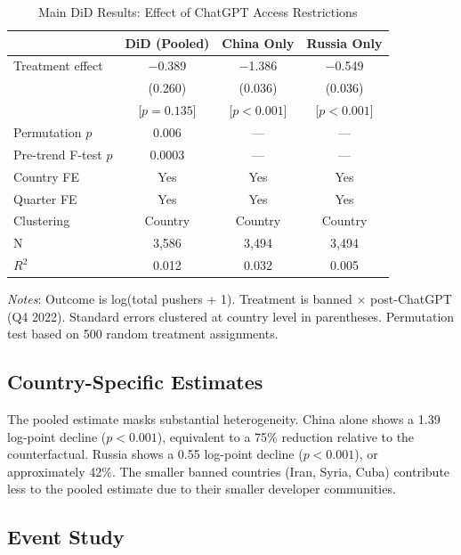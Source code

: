 \documentclass[12pt]{article}
\begin{document}
\begin{table}[H]
\centering
\begin{threeparttable}
\caption{Main DiD Results: Effect of ChatGPT Access Restrictions}
\label{tab:main}
\small
\begin{tabular}{lccc}
\toprule
 & DiD (Pooled) & China Only & Russia Only \\
\midrule
Treatment effect & $-$0.389 & $-$1.386 & $-$0.549 \\
 & (0.260) & (0.036) & (0.036) \\
 & [$p = 0.135$] & [$p < 0.001$] & [$p < 0.001$] \\
\midrule
Permutation $p$ & 0.006 & --- & --- \\
Pre-trend F-test $p$ & 0.0003 & --- & --- \\
\midrule
Country FE & Yes & Yes & Yes \\
Quarter FE & Yes & Yes & Yes \\
Clustering & Country & Country & Country \\
N & 3,586 & 3,494 & 3,494 \\
$R^2$ & 0.012 & 0.032 & 0.005 \\
\bottomrule
\end{tabular}
\begin{tablenotes}
\small
\item \textit{Notes}: Outcome is log(total pushers + 1). Treatment is banned $\times$ post-ChatGPT (Q4 2022). Standard errors clustered at country level in parentheses. Permutation test based on 500 random treatment assignments.
\end{tablenotes}
\end{threeparttable}
\end{table}

\subsection{Country-Specific Estimates}

The pooled estimate masks substantial heterogeneity. China alone shows a 1.39 log-point decline ($p < 0.001$), equivalent to a 75\% reduction relative to the counterfactual. Russia shows a 0.55 log-point decline ($p < 0.001$), or approximately 42\%. The smaller banned countries (Iran, Syria, Cuba) contribute less to the pooled estimate due to their smaller developer communities.

\subsection{Event Study}
\end{document}
